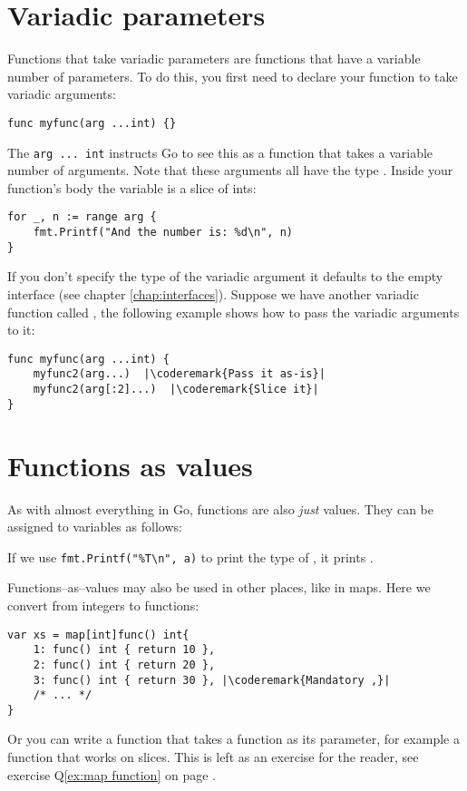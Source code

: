 \section{Variadic parameters}
Functions that take variadic parameters are functions that have a
variable number of parameters. To do this, you first
need to declare your function to take variadic arguments:
\begin{lstlisting}
func myfunc(arg ...int) {}
\end{lstlisting}
The \lstinline{arg ... int} instructs Go to see this as a function that
takes a variable number of arguments. Note that these arguments all
have the type . Inside your function's body the variable
 is a slice of ints:
\begin{lstlisting}
for _, n := range arg {
    fmt.Printf("And the number is: %d\n", n)
}
\end{lstlisting}
If you don't specify the type of the variadic argument it defaults to the
empty interface  (see chapter
\ref{chap:interfaces}).
Suppose we have another variadic function called , the 
following example shows how to pass the variadic arguments to it:
\begin{lstlisting}
func myfunc(arg ...int) {
    myfunc2(arg...)  |\coderemark{Pass it as-is}|
    myfunc2(arg[:2]...)  |\coderemark{Slice it}|
}
\end{lstlisting}

\section{Functions as values}
\label{sec:functions as values}
As with almost everything in Go, functions are also \emph{just} values.
They can be assigned to variables as follows:

If we use \lstinline{fmt.Printf("%T\n", a)} to print the type of
, it prints .

Functions--as--values may also be used in other places, like in maps.
Here we convert from integers to functions:
\begin{lstlisting}[caption=Functions as values in maps]
var xs = map[int]func() int{
    1: func() int { return 10 },
    2: func() int { return 20 },
    3: func() int { return 30 }, |\coderemark{Mandatory ,}|
    /* ... */
}
\end{lstlisting}
Or you can write a function that takes a function as its parameter, for
example a  function that works on  slices. This is
left as an exercise for the reader, see exercise Q\ref{ex:map function}
on page \pageref{ex:map function}.

